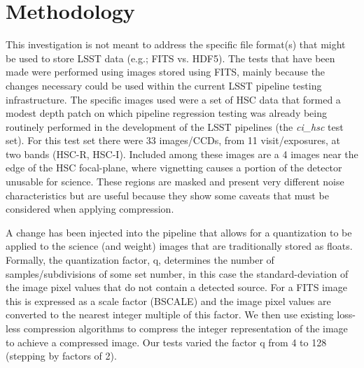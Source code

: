 \section{Methodology}

This investigation is not meant to address the specific file format(s) that might be
used to store LSST data (e.g.; FITS vs. HDF5).  The tests that have been made were performed
using images stored using FITS, mainly because the changes necessary could be used within 
the current LSST pipeline testing infrastructure.  The specific images used were a set of
HSC data that formed a modest depth patch on which pipeline regression testing was already 
being routinely performed in the development of the LSST pipelines (the {\it ci\_hsc} test set).  
For this test set there were 33 images/CCDs, from 11 visit/exposures, at two bands (HSC-R, HSC-I).
Included among these images are a 4 images near the edge of the HSC focal-plane, where 
vignetting causes a portion of the detector unusable for science.  These regions are 
masked and present very different noise characteristics but are useful because they show some 
caveats that must be considered when applying compression.

A change has been injected into the pipeline that allows for a quantization to be applied
to the science (and weight) images that are traditionally stored as floats.  Formally,
the quantization factor, q, determines the number of samples/subdivisions of some set
number, in this case the standard-deviation of the image pixel values that do not contain a 
detected source.  For a FITS image this is expressed as a scale factor (BSCALE) and the image 
pixel values are converted to the nearest integer multiple of this factor.  We then use existing
loss-less compression algorithms to compress the integer representation of the image
to achieve a compressed image.  Our tests varied the factor q from 4 to 128 (stepping by 
factors of 2).

